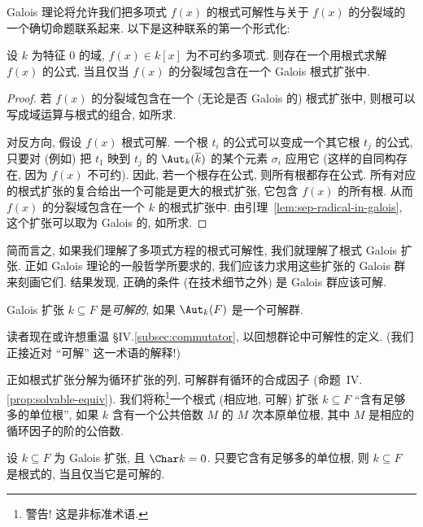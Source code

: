 Galois 理论将允许我们把多项式 $f(x)$ 的根式可解性与关于 $f(x)$ 的分裂域的一个确切命题联系起来. 以下是这种联系的第一个形式化:

\begin{lemma}\label{lem:radical-solvable-equiv}
设 $k$ 为特征 $0$ 的域, $f(x)\in k[x]$ 为不可约多项式. 则存在一个用根式求解 $f(x)$ 的公式, 当且仅当 $f(x)$ 的分裂域包含在一个 Galois 根式扩张中.
\end{lemma}

\begin{proof}
若 $f(x)$ 的分裂域包含在一个 (无论是否 Galois 的) 根式扩张中, 则根可以写成域运算与根式的组合, 如所求.

对反方向, 假设 $f(x)$ 根式可解. 一个根 $t_i$ 的公式可以变成一个其它根 $t_j$ 的公式, 只要对 (例如) 把 $t_1$ 映到 $t_j$ 的 $\Aut_k(\overline{k})$ 的某个元素 $\sigma_i$ 应用它 (这样的自同构存在, 因为 $f(x)$ 不可约). 因此, 若一个根存在公式, 则所有根都存在公式. 所有对应的根式扩张的复合给出一个可能是更大的根式扩张, 它包含 $f(x)$ 的所有根. 从而 $f(x)$ 的分裂域包含在一个 $k$ 的根式扩张中. 由引理~\ref{lem:sep-radical-in-galois}, 这个扩张可以取为 Galois 的, 如所求.
\end{proof}

简而言之, 如果我们理解了多项式方程的根式可解性, 我们就理解了根式 Galois 扩张. 正如 Galois 理论的一般哲学所要求的, 我们应该力求用这些扩张的 Galois 群来刻画它们. 结果发现, 正确的条件 (在技术细节之外) 是 Galois 群应该可解.

\begin{definition}\label{def:solvable-extension}
Galois 扩张 $k\subseteq F$ 是\emph{可解的}, 如果 $\Aut_k(F)$ 是一个可解群.
\end{definition}

读者现在或许想重温 §IV.\ref{subsec:commutator}, 以回想群论中可解性的定义. (我们正接近对 ``可解'' 这一术语的解释!)

正如根式扩张分解为循环扩张的列, 可解群有循环的合成因子 (命题~IV.\ref{prop:solvable-equiv}). 我们将称\footnote{警告! 这是非标准术语.}一个根式 (相应地, 可解) 扩张 $k\subseteq F$ ``含有足够多的单位根'', 如果 $k$ 含有一个公共倍数 $M$ 的 $M$ 次本原单位根, 其中 $M$ 是相应的循环因子的阶的公倍数.

\begin{lemma}\label{lem:radical-solvable-enough-roots}
设 $k\subseteq F$ 为 Galois 扩张, 且 $\Char k=0$. 只要它含有足够多的单位根, 则 $k\subseteq F$ 是根式的, 当且仅当它是可解的.
\end{lemma}

